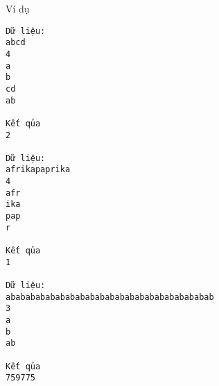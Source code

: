 Ví dụ
\begin{verbatim}
Dữ liệu:
abcd
4
a
b
cd
ab

Kết qủa
2

Dữ liệu:
afrikapaprika
4
afr
ika
pap
r

Kết qủa
1

Dữ liệu:
ababababababababababababababababababababab
3
a
b
ab

Kết qủa
759775
\end{verbatim}